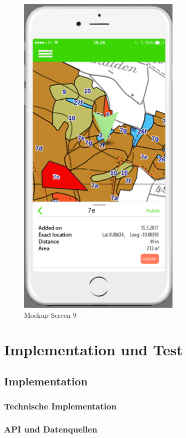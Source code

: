 \begin{figure}[H]
\centering
    \includegraphics[width=0.7\textwidth]{mockup1-9}
    \caption{Mockup Screen 9}
    \label{fig:mesh9}
\end{figure}

\section{Implementation und Test}
\subsection{Implementation}
\subsubsection{Technische Implementation}
\subsubsection{API und Datenquellen}

